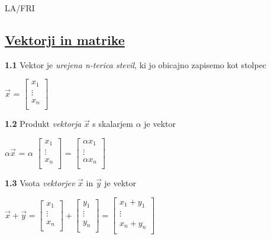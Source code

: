 \documentclass{article}
\begin{document}
\begin{center}
	{\small LA/FRI \par}
\end{center}

\begin{multicols}{4}

	\section{\underline{Vektorji in matrike}}

	\textbf{1.1} Vektor je \textit{urejena n-terica stevil}, ki jo obicajno
	zapisemo kot stolpec\smallskip
	\begin{center}
		$\vec{x}$ =
		$\begin{bmatrix}
				x_{1}  \\
				\vdots \\
				x_{n}  \\
			\end{bmatrix}$
	\end{center}

	\textbf{1.2} Produkt \textit{vektorja} $\vec{x}$ s skalarjem $\alpha$ je vektor
	\begin{center}
		$\alpha \vec{x}$ =
		$\alpha$
		$\begin{bmatrix}
				x_{1}  \\
				\vdots \\
				x_{n}  \\
			\end{bmatrix}$ =
		$\begin{bmatrix}
				\alpha x_{1} \\
				\vdots       \\
				\alpha x_{n} \\
			\end{bmatrix}$
	\end{center}

	\textbf{1.3} Vsota \textit{vektorjev} $\vec{x}$ in $\vec{y}$ je vektor
	\begin{center}
		$\vec{x} + \vec{y} =
			\begin{bmatrix}
				x_{1}  \\
				\vdots \\
				x_{n}  \\
			\end{bmatrix} +
			\begin{bmatrix}
				y_{1}  \\
				\vdots \\
				y_{n}  \\
			\end{bmatrix} =
			\begin{bmatrix}
				x_{1}  +  y_{1} \\
				\vdots          \\
				x_{n} + y_{n}   \\
			\end{bmatrix}
		$
	\end{center}


\end{multicols}
\end{document}

